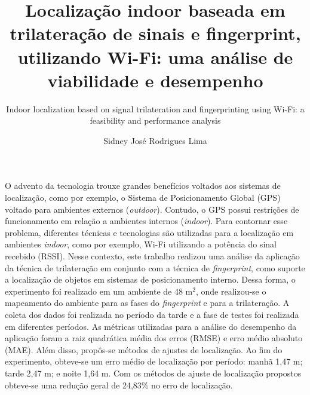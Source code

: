 \documentclass[12pt]{artigoifce}
\title{Localização indoor baseada em trilateração de sinais e fingerprint, utilizando Wi-Fi: uma análise de viabilidade e desempenho}
\subtitle{Indoor localization based on signal trilateration and fingerprinting using Wi-Fi: a feasibility and performance analysis}
\author{Sidney José Rodrigues Lima}
\begin{document}
 

\pretextual
\maketitle
\textual


\renewcommand{\sectionautorefname}{Seção}
\renewcommand{\subsectionautorefname}{Subseção}
\renewcommand{\subsubsectionautorefname}{Subseção}

\pagestyle{abntheadings}

\begin{resumoartigo} 
O advento da tecnologia trouxe grandes benefícios voltados aos sistemas de localização, como por exemplo, o Sistema de Posicionamento Global (GPS) voltado para ambientes externos (\textit{outdoor}). Contudo, o GPS possui restrições de funcionamento em relação a ambientes internos (\textit{indoor}). Para contornar esse problema, diferentes técnicas e tecnologias são utilizadas para a localização em ambientes \textit{indoor}, como por exemplo, Wi-Fi utilizando a potência do sinal recebido (RSSI). Nesse contexto, este trabalho realizou uma análise da aplicação da técnica de trilateração em conjunto com a técnica de \textit{fingerprint}, como suporte a localização de objetos em sistemas de posicionamento interno. Dessa forma, o experimento foi realizado em um ambiente de 48 m$^2$, onde realizou-se o mapeamento do ambiente para as fases do \textit{fingerprint} e para a trilateração. A coleta dos dados foi realizada no período da tarde e a fase de testes foi realizada em diferentes períodos. As métricas utilizadas para a análise do desempenho da aplicação foram a raiz quadrática média dos erros (RMSE) e erro médio absoluto (MAE). Além disso, propôs-se métodos de ajustes de localização. Ao fim do experimento, obteve-se um erro médio de localização por período: manhã 1,47 m; tarde 2,47 m; e noite 1,64 m. Com os métodos de ajuste de localização propostos obteve-se uma redução geral de 24,83\% no erro de localização. %


\end{resumoartigo}
\end{document}
